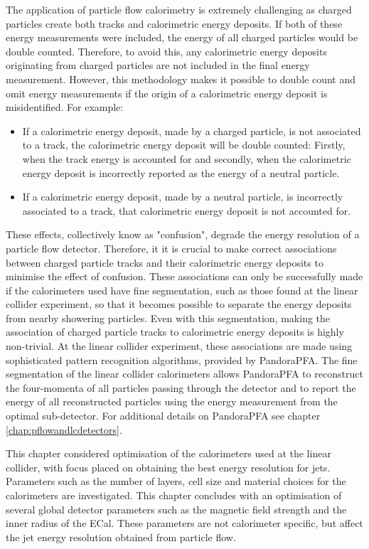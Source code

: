 The application of particle flow calorimetry is extremely challenging as charged particles create both tracks and calorimetric energy deposits.  If both of these energy measurements were included, the energy of all charged particles would be double counted.  Therefore, to avoid this, any calorimetric energy deposits originating from charged particles are not included in the final energy measurement.  However, this methodology makes it possible to double count and omit energy measurements if the origin of a calorimetric energy deposit is misidentified.  For example:
\begin{itemize}
\item If a calorimetric energy deposit, made by a charged particle, is not associated to a track, the calorimetric energy deposit will be double counted: Firstly, when the track energy is accounted for and secondly, when the calorimetric energy deposit is incorrectly reported as the energy of a neutral particle.  
\item If a calorimetric energy deposit, made by a neutral particle, is incorrectly associated to a track, that calorimetric energy deposit is not accounted for.
\end{itemize}
\noindent These effects, collectively know as "confusion", degrade the energy resolution of a particle flow detector.  Therefore, it it is crucial to make correct associations between charged particle tracks and their calorimetric energy deposits to minimise the effect of confusion.  These associations can only be successfully made if the calorimeters used have fine segmentation, such as those found at the linear collider experiment, so that it becomes possible to separate the energy deposits from nearby showering particles.  Even with this segmentation, making the association of charged particle tracks to calorimetric energy deposits is highly non-trivial.  At the linear collider experiment, these associations are made using sophisticated pattern recognition algorithms, provided by PandoraPFA.  The fine segmentation of the linear collider calorimeters allows PandoraPFA to reconstruct the four-momenta of all particles passing through the detector and to report the energy of all reconstructed particles using the energy measurement from the optimal sub-detector.  For additional details on PandoraPFA see chapter \ref{chap:pflowandlcdetectors}.

This chapter considered optimisation of the calorimeters used at the linear collider, with focus placed on obtaining the best energy resolution for jets.  Parameters such as the number of layers, cell size and material choices for the calorimeters are investigated.  This chapter concludes with an optimisation of several global detector parameters such as the magnetic field strength and the inner radius of the ECal.  These parameters are not calorimeter specific, but affect the jet energy resolution obtained from particle flow. 

